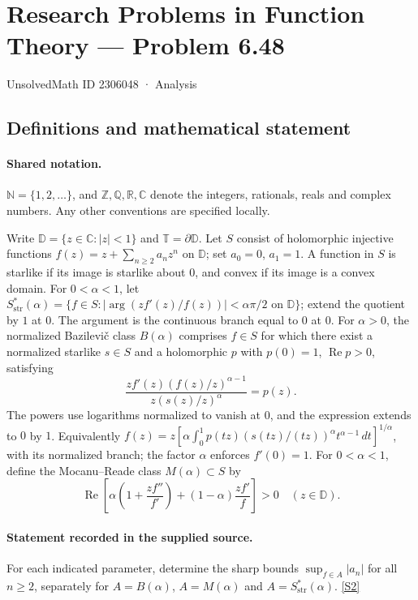 \documentclass[11pt]{article}
\newcommand{\sref}[2]{\hyperlink{source:#1:#2}{[S#2]}}
\begin{document}
\setcounter{section}{2306047}
\section{Research Problems in Function Theory — Problem 6.48}\label{2306048}
{\small\sffamily UnsolvedMath ID 2306048 · Analysis}
\subsection{Definitions and mathematical statement}

\paragraph{Shared notation.}$\mathbb N=\{1,2,\ldots\}$, and $\mathbb Z,\mathbb Q,\mathbb R,\mathbb C$ denote the integers, rationals, reals and complex numbers. Any other conventions are specified locally.


Write $\mathbb D=\{z\in\mathbb C:|z|<1\}$ and $\mathbb T=\partial\mathbb D$. Let $S$ consist of holomorphic injective functions $f(z)=z+\sum_{n\ge2}a_nz^n$ on $\mathbb D$; set $a_0=0$, $a_1=1$. A function in $S$ is starlike if its image is starlike about $0$, and convex if its image is a convex domain. For $0<\alpha<1$, let $S^*_{\mathrm{str}}(\alpha)=\{f\in S:|\arg(zf'(z)/f(z))|<\alpha\pi/2\text{ on }\mathbb D\}$; extend the quotient by $1$ at $0$. The argument is the continuous branch equal to $0$ at $0$. For $\alpha>0$, the normalized Bazilevi\v{c} class $B(\alpha)$ comprises $f\in S$ for which there exist a normalized starlike $s\in S$ and a holomorphic $p$ with $p(0)=1$, $\operatorname{Re}p>0$, satisfying
\[\frac{zf'(z)(f(z)/z)^{\alpha-1}}{z(s(z)/z)^\alpha}=p(z).\]
The powers use logarithms normalized to vanish at $0$, and the expression extends to $0$ by $1$. Equivalently $f(z)=z\left[\alpha\int_0^1p(tz)(s(tz)/(tz))^\alpha t^{\alpha-1}\,dt\right]^{1/\alpha}$, with its normalized branch; the factor $\alpha$ enforces $f'(0)=1$. For $0<\alpha<1$, define the Mocanu--Reade class $M(\alpha)\subset S$ by
\[\operatorname{Re}\left[\alpha\left(1+\frac{zf''}{f'}\right)+(1-\alpha)\frac{zf'}{f}\right]>0\quad(z\in\mathbb D).\]
\paragraph{Statement recorded in the supplied source.}
For each indicated parameter, determine the sharp bounds $\sup_{f\in A}|a_n|$ for all $n\ge2$, separately for $A=B(\alpha)$, $A=M(\alpha)$ and $A=S^*_{\mathrm{str}}(\alpha)$. \sref{2306048}{2}
\end{document}
